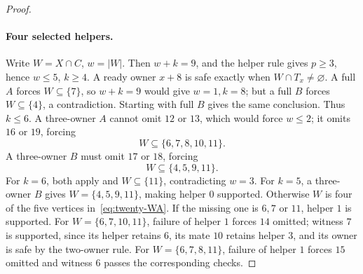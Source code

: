 \begin{proof}
\paragraph{Four selected helpers.}
Write $W=X\cap C$, $w=|W|$. Then $w+k=9$, and the helper rule gives
$p\ge3$, hence $w\le5$, $k\ge4$. A ready owner $x+8$ is safe exactly
when $W\cap T_x\ne\varnothing$. A full $A$ forces $W\subseteq\{7\}$,
so $w+k=9$ would give $w=1,k=8$; but a full $B$ forces
$W\subseteq\{4\}$, a contradiction. Starting with full $B$ gives the same
conclusion. Thus $k\le6$. A three-owner $A$ cannot omit $12$ or $13$,
which would force $w\le2$; it omits $16$ or $19$, forcing
\begin{equation}\label{eq:twenty-WA}
 W\subseteq\{6,7,8,10,11\}.
\end{equation}
A three-owner $B$ must omit $17$ or $18$, forcing
\begin{equation}\label{eq:twenty-WB}
 W\subseteq\{4,5,9,11\}.
\end{equation}
For $k=6$, both apply and $W\subseteq\{11\}$, contradicting $w=3$.
For $k=5$, a three-owner $B$ gives $W=\{4,5,9,11\}$, making helper $0$
supported. Otherwise $W$ is four of the five vertices
in~\eqref{eq:twenty-WA}. If the missing one is $6,7$ or $11$, helper $1$
is supported. For $W=\{6,7,10,11\}$, failure of helper $1$ forces $14$
omitted; witness $7$ is supported, since its helper retains $6$, its mate
$10$ retains helper $3$, and its owner is safe by the two-owner rule.
For $W=\{6,7,8,11\}$, failure of helper $1$ forces $15$ omitted and
witness $6$ passes the corresponding checks.


\end{proof}
